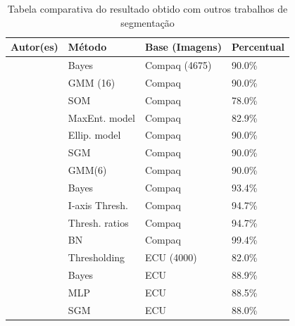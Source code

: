 \documentclass[12pt,oneside,a4paper,english,french,spanish,brazil,]{abntex2}
\begin{document}
\begin{table}
\centering
\caption{Tabela comparativa do resultado obtido com outros trabalhos de segmentação }
\label{tab:ComparativoResultados}
\begin{tabular}{llll}
\hline
\textbf{Autor(es)}           & \textbf{Método} & \textbf{Base (Imagens)}         & \textbf{Percentual} \\ \hline
\citet{jones:2002}           & Bayes                          & Compaq (4675) & 90.0\%              \\
                             & GMM (16)                       & Compaq                & 90.0\%              \\
\citet{brown:2001}           & SOM                            & Compaq                & 78.0\%              \\
\citet{jedynak:2003}         & MaxEnt. model                  & Compaq                & 82.9\%              \\
\citet{lee:2002}             & Ellip. model                   & Compaq                & 90.0\%              \\
                             & SGM                            & Compaq                & 90.0\%              \\
                             & GMM(6)                         & Compaq                & 90.0\%              \\
\citet{brand:2000}           & Bayes                          & Compaq                & 93.4\%              \\
                             & I-axis Thresh.                 & Compaq                & 94.7\%              \\
                             & Thresh. ratios                 & Compaq                & 94.7\%              \\
\citet{sebe:2004}            & BN                             & Compaq                & 99.4\%              \\
\citet{phung:2001}           & Thresholding                   & ECU (4000)    & 82.0\%              \\
                             & Bayes                          & ECU                   & 88.9\%              \\
                             & MLP                            & ECU                   & 88.5\%              \\
                             & SGM                            & ECU                   & 88.0\%              \\

\end{tabular}
\end{table}
\end{document}
